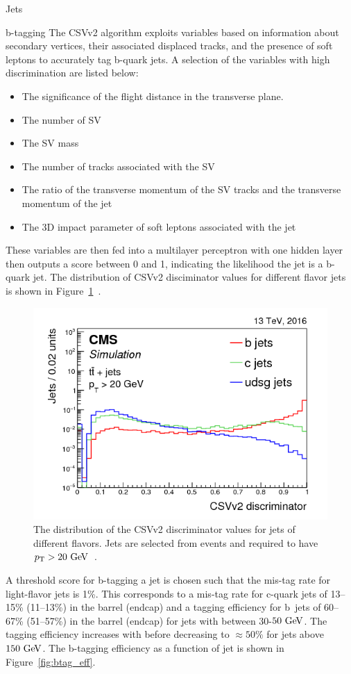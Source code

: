 \begin{section}{Jets}
\begin{subsection}{b-tagging}
The CSVv2 algorithm exploits variables based on information about secondary vertices, their associated displaced tracks, and the presence of soft leptons to accurately tag b-quark jets.
A selection of the variables with high discrimination are listed below:

\begin{itemize}
\item The significance of the flight distance in the transverse plane.
\item The number of SV
\item The SV mass
\item The number of tracks associated with the SV
\item The ratio of the transverse momentum of the SV tracks and the transverse momentum of the jet
\item The 3D impact parameter of soft leptons associated with the jet
\end{itemize}

These variables are then fed into a multilayer perceptron with one hidden layer then outputs a score between 0 and 1, indicating the likelihood the jet is a b-quark jet.
The distribution of CSVv2 disciminator values for different flavor jets is shown in Figure~\ref{fig:csv_discriminator}~\cite{Sirunyan:2017ezt}.

\begin{figure}[tbp!]
\centering
\includegraphics[angle=0,width=0.80\columnwidth]{fig/csv_discriminator.png}
\caption{The distribution of the CSVv2 discriminator values for jets of different flavors.
Jets are selected from \ttbar events and required to have $p_{\mathrm{T}} > 20~\mathrm{Ge\kern -0.1em V}$~\cite{Sirunyan:2017ezt}.}
\label{fig:csv_discriminator}
\end{figure}

A threshold score for b-tagging a jet is chosen such that the mis-tag rate for light-flavor jets is 1\%.
This corresponds to a mis-tag rate for c-quark jets of 13--15\% (11--13\%) in the barrel (endcap) and a tagging efficiency for b~jets of 60--67\% (51--57\%) in the barrel (endcap) for jets with \pT between $30$-$50~\mathrm{Ge\kern -0.1em V}$.
The tagging efficiency increases with \pT before decreasing to $\approx 50\%$ for jets above $150~\mathrm{Ge\kern -0.1em V}$.
The b-tagging efficiency as a function of jet \pT is shown in Figure~\ref{fig:btag_eff}.


\end{subsection}
\end{section}
